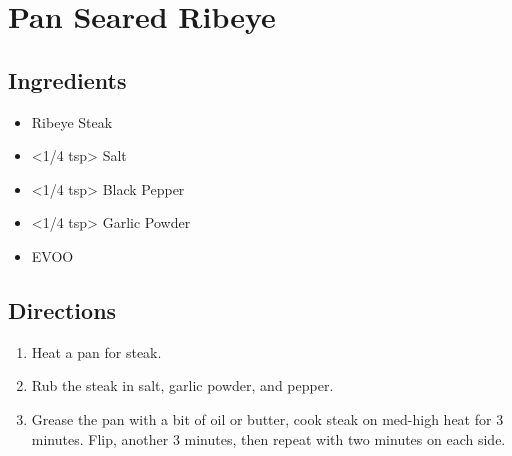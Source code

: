 \section{Pan Seared Ribeye}

\subsection{ Ingredients }

\begin{itemize}
  \item <8 oz> Ribeye Steak
  \item <1/4 tsp> Salt
  \item <1/4 tsp> Black Pepper
  \item <1/4 tsp> Garlic Powder
  \item <1 tsp> EVOO
\end{itemize}

\subsection{ Directions }

\begin{enumerate}
  \item Heat a pan for steak. 
  \item Rub the steak in salt, garlic powder, and pepper. 
  \item Grease the pan with a bit of oil or butter, cook steak on med-high heat for 3 minutes. Flip, another 3 minutes, then repeat with two minutes on each side. 
\end{enumerate}

